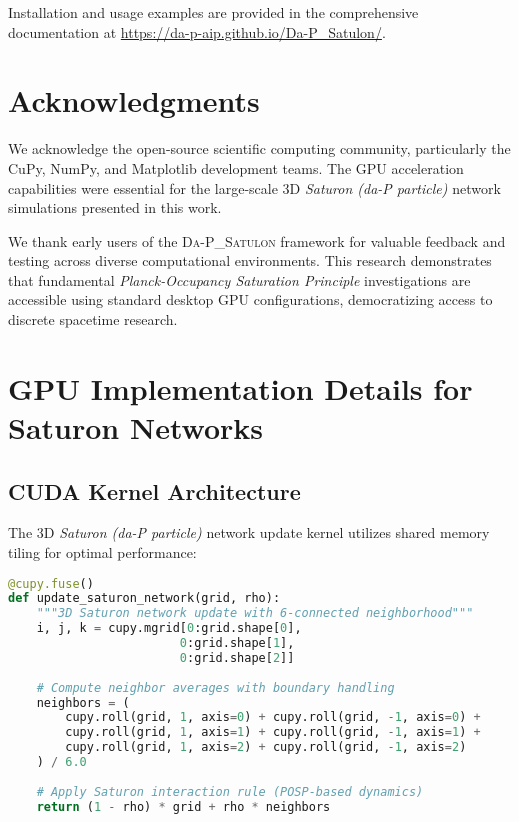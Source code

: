 \documentclass[twocolumn,showpacs,preprintnumbers,amsmath,amssymb,prb]{revtex4-2}
\newcommand{\satulon}{\textsc{Da-P\_Satulon}}
\newcommand{\saturon}{\textit{Saturon (da-P particle)}}
\newcommand{\posp}{\textit{Planck-Occupancy Saturation Principle}}
\begin{document}
Installation and usage examples are provided in the comprehensive documentation at \url{https://da-p-aip.github.io/Da-P_Satulon/}.

\section*{Acknowledgments}

We acknowledge the open-source scientific computing community, particularly the CuPy, NumPy, and Matplotlib development teams. The GPU acceleration capabilities were essential for the large-scale 3D \saturon{} network simulations presented in this work.

We thank early users of the \satulon{} framework for valuable feedback and testing across diverse computational environments. This research demonstrates that fundamental \posp{} investigations are accessible using standard desktop GPU configurations, democratizing access to discrete spacetime research.




\appendix

\section{GPU Implementation Details for Saturon Networks}
\label{app:gpu}

\subsection{CUDA Kernel Architecture}

The 3D \saturon{} network update kernel utilizes shared memory tiling for optimal performance:

\begin{lstlisting}[language=Python, caption=GPU-accelerated 3D Saturon network update kernel]
@cupy.fuse()
def update_saturon_network(grid, rho):
    """3D Saturon network update with 6-connected neighborhood"""
    i, j, k = cupy.mgrid[0:grid.shape[0], 
                        0:grid.shape[1], 
                        0:grid.shape[2]]
    
    # Compute neighbor averages with boundary handling
    neighbors = (
        cupy.roll(grid, 1, axis=0) + cupy.roll(grid, -1, axis=0) +
        cupy.roll(grid, 1, axis=1) + cupy.roll(grid, -1, axis=1) +
        cupy.roll(grid, 1, axis=2) + cupy.roll(grid, -1, axis=2)
    ) / 6.0
    
    # Apply Saturon interaction rule (POSP-based dynamics)
    return (1 - rho) * grid + rho * neighbors
\end{lstlisting}
\end{document}
